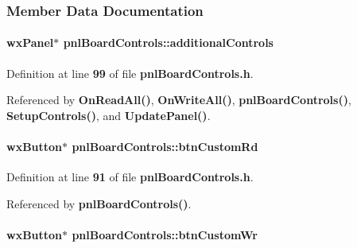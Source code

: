 \subsubsection{Member Data Documentation}
\paragraph[{additional\+Controls}]{\setlength{\rightskip}{0pt plus 5cm}wx\+Panel$\ast$ pnl\+Board\+Controls\+::additional\+Controls\hspace{0.3cm}{\ttfamily [protected]}}\label{classpnlBoardControls_a3b0d74c66b008ab380599cc4060017d8}


Definition at line {\bf 99} of file {\bf pnl\+Board\+Controls.\+h}.



Referenced by {\bf On\+Read\+All()}, {\bf On\+Write\+All()}, {\bf pnl\+Board\+Controls()}, {\bf Setup\+Controls()}, and {\bf Update\+Panel()}.

\paragraph[{btn\+Custom\+Rd}]{\setlength{\rightskip}{0pt plus 5cm}wx\+Button$\ast$ pnl\+Board\+Controls\+::btn\+Custom\+Rd\hspace{0.3cm}{\ttfamily [protected]}}\label{classpnlBoardControls_aa5516294f004d80aeabd714b86c8520a}


Definition at line {\bf 91} of file {\bf pnl\+Board\+Controls.\+h}.



Referenced by {\bf pnl\+Board\+Controls()}.

\paragraph[{btn\+Custom\+Wr}]{\setlength{\rightskip}{0pt plus 5cm}wx\+Button$\ast$ pnl\+Board\+Controls\+::btn\+Custom\+Wr\hspace{0.3cm}{\ttfamily [protected]}}\label{classpnlBoardControls_a18b58594870fd2ce5ce01901dacbe1f8}


